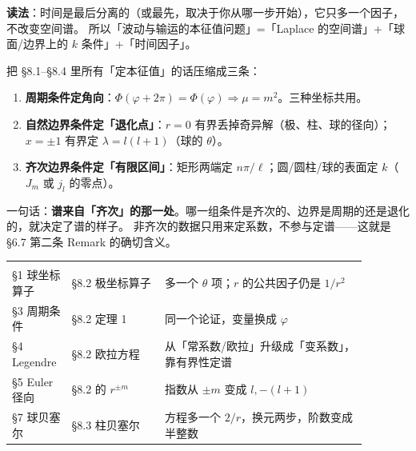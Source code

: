 \textbf{读法}：时间是最后分离的（或最先，取决于你从哪一步开始），它只多一个因子，不改变空间谱。
所以「波动与输运的本征值问题」=「Laplace 的空间谱」+「球面/边界上的 $k$ 条件」+「时间因子」。


把 §8.1--§8.4 里所有「定本征值」的话压缩成三条：

\begin{enumerate}[label=\textbf{(\arabic*)}]
  \item \textbf{周期条件定角向}：$\Phi(\varphi+2\pi)=\Phi(\varphi)\Rightarrow\mu=m^2$。三种坐标共用。
  \item \textbf{自然边界条件定「退化点」}：$r=0$ 有界丢掉奇异解（极、柱、球的径向）；$x=\pm1$ 有界定 $\lambda=l(l+1)$（球的 $\theta$）。
  \item \textbf{齐次边界条件定「有限区间」}：矩形两端定 $n\pi/\ell$；圆/圆柱/球的表面定 $k$（$J_m$ 或 $j_l$ 的零点）。
\end{enumerate}

一句话：\textbf{谱来自「齐次」的那一处}。哪一组条件是齐次的、边界是周期的还是退化的，就决定了谱的样子。
非齐次的数据只用来定系数，不参与定谱——这就是 \S6.7 第二条 Remark 的确切含义。


\begin{center}
\tabtop
\begin{tabular}{@{}L{0.12\linewidth}L{0.24\linewidth}L{0.52\linewidth}@{}}
 &  &  \\
\tabmidrule
\S1 球坐标算子 & §8.2 极坐标算子 & 多一个 $\theta$ 项；$r$ 的公共因子仍是 $1/r^2$ \\
\S3 周期条件 & §8.2 定理 1 & 同一个论证，变量换成 $\varphi$ \\
\S4 Legendre & §8.2 欧拉方程 & 从「常系数/欧拉」升级成「变系数」，靠有界性定谱 \\
\S5 Euler 径向 & §8.2 的 $r^{\pm m}$ & 指数从 $\pm m$ 变成 $l,-(l+1)$ \\
\S7 球贝塞尔 & §8.3 柱贝塞尔 & 方程多一个 $2/r$，换元两步，阶数变成半整数 \\
\end{tabular}
\tabbot
\end{center}

\label{sec:s9}


